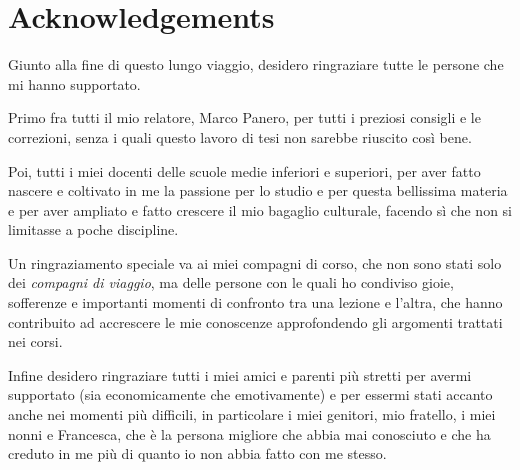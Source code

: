 \pagestyle{solopagina}
\renewcommand{\headrulewidth}{0.0pt}
\fancyhead{}
\fancyfoot{}

\section*{Acknowledgements}

Giunto alla fine di questo lungo viaggio, desidero ringraziare tutte le persone che mi hanno supportato.

Primo fra tutti il mio relatore, Marco Panero, per tutti i preziosi consigli e le correzioni, senza i quali questo lavoro di tesi non sarebbe riuscito così bene.

Poi, tutti i miei docenti delle scuole medie inferiori e superiori, per aver fatto nascere e coltivato in me la passione per lo studio e per questa bellissima materia e per aver ampliato e fatto crescere il mio bagaglio culturale, facendo sì che non si limitasse a poche discipline.

Un ringraziamento speciale va ai miei compagni di corso, che non sono stati solo dei \emph{compagni di viaggio}, ma delle persone con le quali ho condiviso gioie, sofferenze e importanti momenti di confronto tra una lezione e l'altra, che hanno contribuito ad accrescere le mie conoscenze approfondendo gli argomenti trattati nei corsi.

Infine desidero ringraziare tutti i miei amici e parenti più stretti per avermi supportato (sia economicamente che emotivamente) e per essermi stati accanto anche nei momenti più difficili, in particolare i miei genitori, mio fratello, i miei nonni e Francesca, che è la persona migliore che abbia mai conosciuto e che ha creduto in me più di quanto io non abbia fatto con me stesso.
